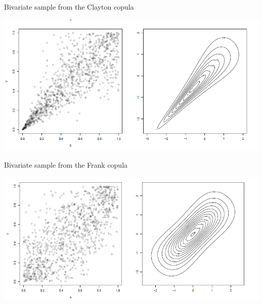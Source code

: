 \documentclass[11pt]{beamer}
\theoremstyle{plain}
\theoremstyle{definition}
\theoremstyle{remark}
\begin{document}
\begin{frame}{Bivariate sample from the Clayton copula}
	\begin{center}
	\includegraphics[scale=.5]{fig/copule_archimedee_clayton_plot.PNG} 	
	\end{center}
\end{frame}
%
\begin{frame}{Bivariate sample from the Frank copula}
	\begin{center}
	\includegraphics[scale=.5]{fig/copule_archimedee_frank_plot.PNG} 	
	\end{center}
\end{frame}
\end{document}
